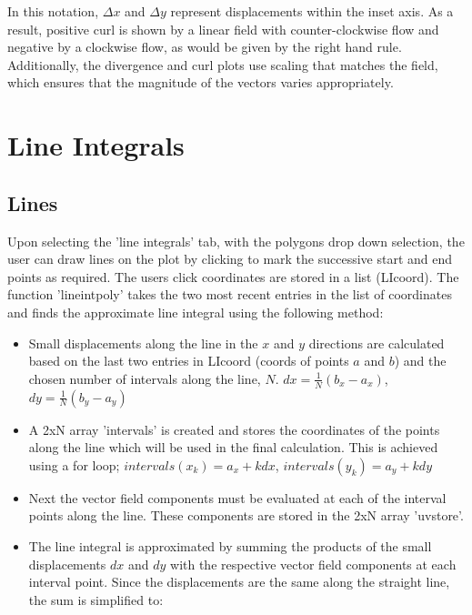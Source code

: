 \documentclass[12pt]{report}
\begin{document}
In this notation, $\Delta x$ and $\Delta y$ represent displacements within the inset axis. As a result, positive curl is shown by a linear field with counter-clockwise flow and negative by a clockwise flow, as would be given by the right hand rule. Additionally, the divergence and curl plots use scaling that matches the field, which ensures that the magnitude of the vectors varies appropriately. 

\section{Line Integrals}
\subsection{Lines}

Upon selecting the 'line integrals' tab, with the polygons drop down selection, the user can draw lines on the plot by clicking to mark the successive start and end points as required. The users click coordinates are stored in a list (LI\textunderscore coord). The function 'line\textunderscore int\textunderscore poly' takes the two most recent entries in the list of coordinates and finds the approximate line integral using the following method:

\begin{itemize}
	\item Small displacements along the line in the $x$ and $y$ directions are calculated based on the last two entries in LI\textunderscore coord (coords of points $a$ and $b$) and the chosen number of intervals along the line, $N$. $dx = \frac{1}{N} (b_x - a_x)$,  $dy = \frac{1}{N} (b_y - a_y)$
	\item A 2xN array 'intervals' is created and stores the coordinates of the points along the line which will be used in the final calculation. This is achieved using a for loop; $intervals(x_k) = a_x + k dx$, $intervals(y_k) = a_y + k dy$
	\item Next the vector field components must be evaluated at each of the interval points along the line. These components are stored in the 2xN array 'uv\textunderscore store'. 
	\item The line integral is approximated by summing the products of the small displacements $dx$ and $dy$ with the respective vector field components at each interval point. Since the displacements are the same along the straight line, the sum is simplified to:
\end{itemize}
\end{document}
